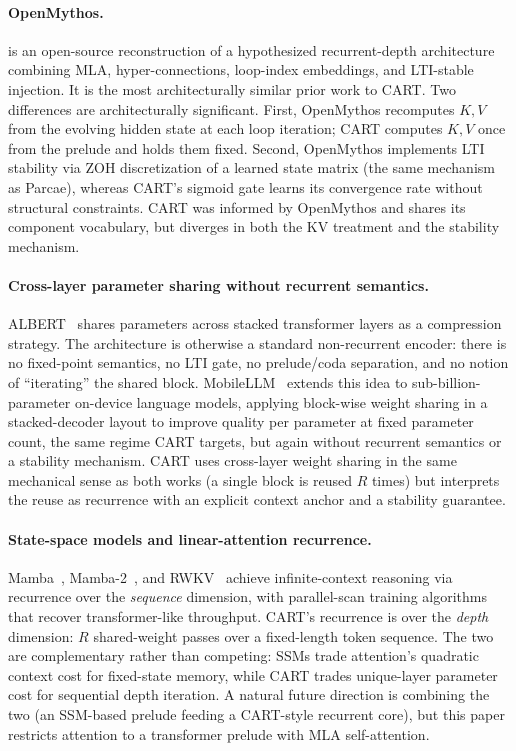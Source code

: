 \documentclass{article}
\newcommand{\cart}{\textsc{CART}}
\begin{document}
\paragraph{OpenMythos.}
\citet{gomez2026openmythos} is an open-source reconstruction of a hypothesized recurrent-depth architecture combining MLA, hyper-connections, loop-index embeddings, and LTI-stable injection. It is the most architecturally similar prior work to \cart{}. Two differences are architecturally significant. First, OpenMythos recomputes $K, V$ from the evolving hidden state at each loop iteration; \cart{} computes $K, V$ once from the prelude and holds them fixed. Second, OpenMythos implements LTI stability via ZOH discretization of a learned state matrix (the same mechanism as Parcae), whereas \cart{}'s sigmoid gate learns its convergence rate without structural constraints. \cart{} was informed by OpenMythos and shares its component vocabulary, but diverges in both the KV treatment and the stability mechanism.

\paragraph{Cross-layer parameter sharing without recurrent semantics.}
ALBERT~\citep{lan2020albert} shares parameters across stacked transformer layers as a compression strategy. The architecture is otherwise a standard non-recurrent encoder: there is no fixed-point semantics, no LTI gate, no prelude/coda separation, and no notion of ``iterating'' the shared block. MobileLLM~\citep{liu2024mobilellm} extends this idea to sub-billion-parameter on-device language models, applying block-wise weight sharing in a stacked-decoder layout to improve quality per parameter at fixed parameter count, the same regime \cart{} targets, but again without recurrent semantics or a stability mechanism. \cart{} uses cross-layer weight sharing in the same mechanical sense as both works (a single block is reused $R$ times) but interprets the reuse as recurrence with an explicit context anchor and a stability guarantee.

\paragraph{State-space models and linear-attention recurrence.}
Mamba~\citep{gu2023mamba}, Mamba-2~\citep{dao2024mamba2}, and RWKV~\citep{peng2023rwkv} achieve infinite-context reasoning via recurrence over the \emph{sequence} dimension, with parallel-scan training algorithms that recover transformer-like throughput. \cart{}'s recurrence is over the \emph{depth} dimension: $R$ shared-weight passes over a fixed-length token sequence. The two are complementary rather than competing: SSMs trade attention's quadratic context cost for fixed-state memory, while \cart{} trades unique-layer parameter cost for sequential depth iteration. A natural future direction is combining the two (an SSM-based prelude feeding a \cart{}-style recurrent core), but this paper restricts attention to a transformer prelude with MLA self-attention.
\end{document}
